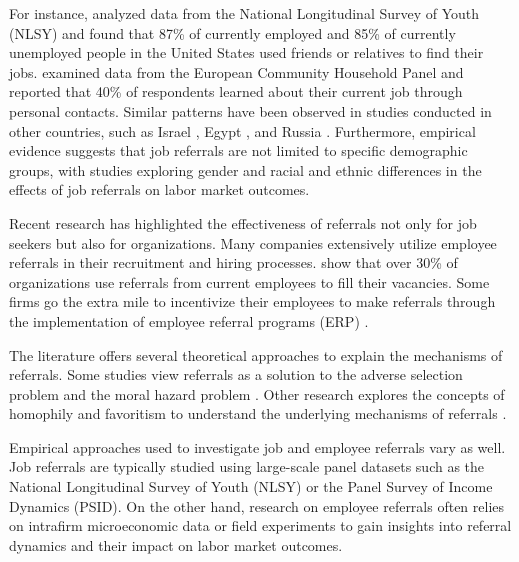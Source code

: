 \documentclass[12pt]{article}
\begin{document}
For instance, \cite{holzer1987job} analyzed data from the National Longitudinal Survey of Youth (NLSY) and found that 87\% of currently employed and 85\% of currently unemployed people in the United States used friends or relatives to find their jobs. \cite{pellizzari2010friends} examined data from the European Community Household Panel and reported that 40\% of respondents learned about their current job through personal contacts. Similar patterns have been observed in studies conducted in other countries, such as Israel \citep{alon1997job}, Egypt \citep{wahba2005density}, and Russia \citep{yakubovich2005weak}. Furthermore, empirical evidence suggests that job referrals are not limited to specific demographic groups, with studies exploring gender \citep{corcoran1980most, morrison1990women, lalanne2016old} and racial and ethnic differences \citep{datcher1983impact, green1999racial, loury2006some} in the effects of job referrals on labor market outcomes.

Recent research has highlighted the effectiveness of referrals not only for job seekers but also for organizations. Many companies extensively utilize employee referrals in their recruitment and hiring processes. \cite{holzer1987hiring, neckerman1991hiring, marsden2001social} show that over 30\% of organizations use referrals from current employees to fill their vacancies. Some firms go the extra mile to incentivize their employees to make referrals through the implementation of employee referral programs (ERP) \citep{ekinci2016employee, friebel2023employee}. 

The literature offers several theoretical approaches to explain the mechanisms of referrals. Some studies view referrals as a solution to the adverse selection problem \citep{rees1966information, saloner1985old, ekinci2016employee} and the moral hazard problem \citep{kugler2003employee, castilla2005social, heath2018firms}. Other research explores the concepts of homophily and favoritism to understand the underlying mechanisms of referrals \citep{montgomery1991social, beaman2012gets, galenianos2013learning}.

Empirical approaches used to investigate job and employee referrals vary as well. Job referrals are typically studied using large-scale panel datasets such as the National Longitudinal Survey of Youth (NLSY) or the Panel Survey of Income Dynamics (PSID). On the other hand, research on employee referrals often relies on intrafirm microeconomic data \citep{burks2015value} or field experiments \citep{beaman2012gets, friebel2023employee} to gain insights into referral dynamics and their impact on labor market outcomes.
\end{document}
